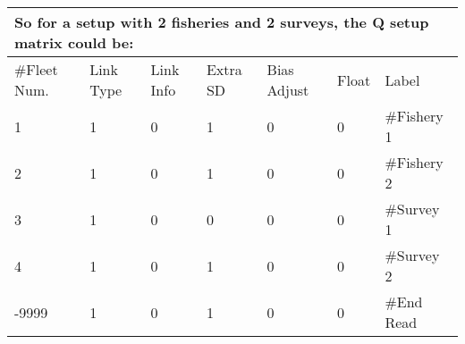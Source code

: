 \begin{center}
	\begin{longtable}{p{2cm} p{2cm} p{2cm} p{2cm} p{2cm} p{2cm} p{2cm}}
		\multicolumn{7}{l}{So for a setup with 2 fisheries and 2 surveys, the Q setup matrix could be:}\\
		\hline
	    \#Fleet Num. & Link Type & Link Info & Extra SD & Bias Adjust & Float  & Label \\
	    \hline
	    1 & 1 & 0 & 1 & 0 & 0 & \#Fishery 1 \\
	    2 & 1 & 0 & 1 & 0 & 0 & \#Fishery 2 \\
	    3 & 1 & 0 & 0 & 0 & 0 & \#Survey 1 \\
	    4 & 1 & 0 & 1 & 0 & 0 & \#Survey 2 \\
	    -9999 & 1 & 0 & 1 & 0 & 0 & \#End Read \\
	    \hline
	\end{longtable}
\end{center}






